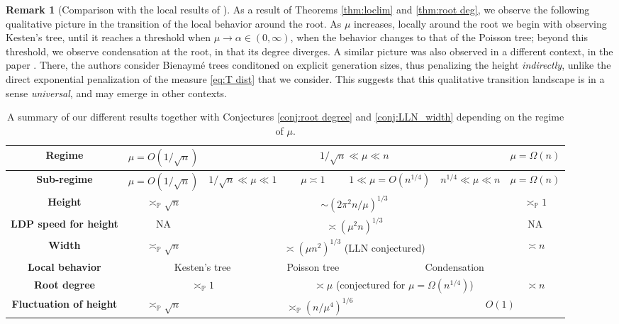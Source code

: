 \documentclass{article}
\newcommand{\1}{\mathbbm{1}}								%
\theoremstyle{definition}
\newtheorem{remark}[theorem]{Remark}
\numberwithin{equation}{section}
\begin{document}
\begin{remark}[Comparison with the local results of \cite{abraham2020very}]
As a result of Theorems \ref{thm:loclim} and \ref{thm:root deg}, we observe the following qualitative picture in the transition of the local behavior around the root. As $\mu$ increases, locally around the root we begin with observing Kesten's tree, until it reaches a threshold when $\mu \to \alpha \in (0,\infty)$, when the behavior changes to that of the Poisson tree; beyond this threshold, we observe condensation at the root, in that its degree diverges. A similar picture was also observed in a different context, in the paper \cite{abraham2020very}. There, the authors consider Bienaymé trees conditoned on explicit generation sizes, thus penalizing the height \emph{indirectly}, unlike the direct exponential penalization of the measure \eqref{eq:T dist} that we consider.
This suggests that this qualitative transition landscape is in a sense \emph{universal}, and may emerge in other contexts.



\end{remark}
\begin{table}[H]
    \renewcommand{\arraystretch}{1.25}
    \centering

    \begin{tabular}{|c|c|c|c|c|c|c|}
        \hline
        \textbf{Regime} & $\mu=O( 1/\sqrt{n})$ & \multicolumn{4}{|c|}{$1/\sqrt{n}\ll\mu\ll n$} & $\mu=\Omega(n)$ \\
        \hline
        \textbf{Sub-regime} & $\mu=O( 1/\sqrt{n})$ & $1/\sqrt{n}\ll\mu\ll1$ & $\mu\asymp 1$ & $1\ll\mu=O(n^{1/4})$ & $n^{1/4}\ll\mu\ll n$ & $\mu=\Omega(n)$ \\
        \hline\hline
        \textbf{Height} & $\asymp_{\mathbb{P}} \sqrt{n}$ & \multicolumn{4}{|c|}{$\sim(2\pi^2n/\mu)^{1/3}$} & $\asymp_{\mathbb{P}} 1$ \\
        \hline
        \textbf{LDP speed for height} & NA
        & \multicolumn{4}{|c|}{$\asymp  (\mu^2n)^{1/3}$} & NA \\
        \hline
        \textbf{Width} & $\asymp_{\mathbb{P}} \sqrt{n}$& \multicolumn{4}{|c|}{$\asymp  (\mu n^2)^{1/3}$ (LLN conjectured)} & $\asymp  n$ \\
        \hline
        \textbf{Local behavior} & \multicolumn{2}{|c|}{Kesten's tree} & Poisson tree &  \multicolumn{3}{|c|}{Condensation} \\
        \hline
        \textbf{Root degree} & \multicolumn{2}{|c|}{$\asymp_{\mathbb{P}}  1$} & \multicolumn{3}{|c|}{$\asymp \mu$ (conjectured for $\mu=\Omega(n^{1/4})$)} & $\asymp  n$ \\
        \hline
        \textbf{Fluctuation of height} & $\asymp_{\mathbb{P}} \sqrt{n}$ & \multicolumn{3}{|c|}{$\asymp_{\mathbb{P}} (n/\mu^4)^{1/6}$} & \multicolumn{2}{|c|}{$O(1)$} \\
        \hline
    \end{tabular}
    \caption{
        A summary of our different results together with Conjectures \ref{conj:root degree} and \ref{conj:LLN_width} depending on the regime of $\mu$. 
    }
    \label{tab:results}
\end{table}
\end{document}
